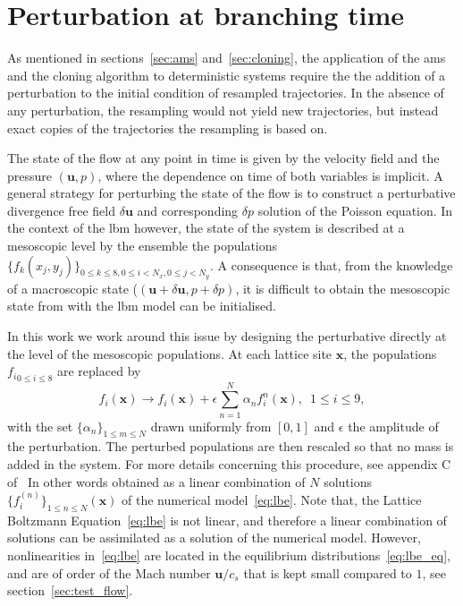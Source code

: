 \section{Perturbation at branching time}
\label{app:perturb_branching_time}
As mentioned in sections~\ref{sec:ams} and~\ref{sec:cloning}, the application of the \ac{ams} and the cloning algorithm to deterministic systems require the the addition of a perturbation to the initial condition of
resampled trajectories.
In the absence of any perturbation, the resampling would not yield new trajectories, but instead exact copies of the trajectories the resampling is based on.

The state of the flow at any point in time is given by the velocity field and the pressure $(\mathbf{u}, p)$, where the dependence on time of both variables is implicit.
A general strategy for perturbing the state of the flow is to construct a perturbative divergence free field $\delta \mathbf{u}$ and corresponding $\delta p$ solution of the
Poisson equation.
In the context of the \ac{lbm} however, the state of the system is described at a mesoscopic level by the ensemble the populations $\{f_k(x_j, y_j)\}_{0\le k \le 8, 0 \le i <N_x, 0 \le j < N_y}$.
A consequence is that, from the knowledge of a macroscopic state ($(\mathbf{u}+\delta \mathbf{u}, p + \delta p)$, it is difficult to obtain the mesoscopic state from with the \ac{lbm} model can be initialised.

In this work we work around this issue by designing the perturbative directly at the level of the mesoscopic populations.
At each lattice site $\mathbf{x}$, the populations ${f_i}_{0\le i \le 8}$ are replaced by
\begin{equation}
  f_{i}(\mathbf{x}) \longrightarrow f_i(\mathbf{x}) + \epsilon \sum_{n=1}^{N} \alpha_{n}f_{i}^{n}(\mathbf{x}), \,\,\, 1\leq i \leq 9,
  \label{eq:perturb_pop}
\end{equation}
with the set $\{\alpha_n\}_{1\leq m \leq N}$ drawn uniformly from $[0,1]$ and $\epsilon$ the amplitude of the perturbation. The perturbed populations are then rescaled so that no mass is added in the system.
For more details concerning this procedure, see appendix C of~\cite{lestang:tel-01974316}
In other words obtained as a linear combination of $N$ solutions $\{f_i^{(n)}\}_{1\le n \le N}(\mathbf{x})$ of the numerical model~\eqref{eq:lbe}.
Note that, the Lattice Boltzmann Equation~\eqref{eq:lbe} is not linear, and therefore a linear combination of solutions can be assimilated as a solution of the numerical model.
However, nonlinearities in~\eqref{eq:lbe} are located in the equilibrium distributions~\eqref{eq:lbe_eq}, and are of order of the Mach number $\mathbf{u}/c_s$ that is kept small compared to $1$, see section~\ref{sec:test_flow}.

